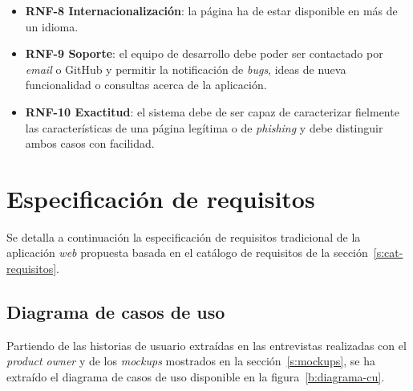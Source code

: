 \begin{itemize}
	\item \textbf{RNF-8 Internacionalización}: la página ha de estar disponible en más de un idioma.
	\item \textbf{RNF-9 Soporte}: el equipo de desarrollo debe poder ser contactado por \textit{email} o GitHub y permitir la notificación de \textit{bugs}, ideas de nueva funcionalidad o consultas acerca de la aplicación.
	\item \textbf{RNF-10 Exactitud}: el sistema debe de ser capaz de caracterizar fielmente las características de una página legítima o de \textit{phishing} y debe distinguir ambos casos con facilidad.
\end{itemize}

\section{Especificación de requisitos}
\label{s:requisitos}

Se detalla a continuación la especificación de requisitos tradicional de la aplicación \textit{web} propuesta basada en el catálogo de requisitos de la sección~\ref{s:cat-requisitos}.

\subsection{Diagrama de casos de uso}
\label{ss:diagrama-casos-uso}

Partiendo de las historias de usuario extraídas en las entrevistas realizadas con el \textit{product owner} y de los \textit{mockups} mostrados en la sección~\ref{s:mockups}, se ha extraído el diagrama de casos de uso disponible en la figura~\ref{b:diagrama-cu}.

